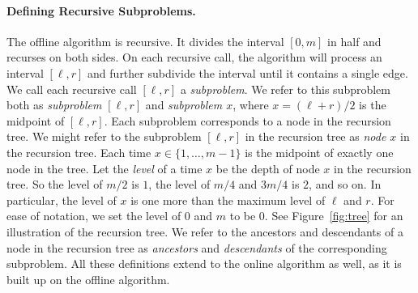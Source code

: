 \documentclass[11pt]{article}
\newcommand{\defn}{\emph}
\begin{document}
\paragraph{Defining Recursive Subproblems.}
The offline algorithm is recursive.
It divides the interval $[0,m]$ in half and recurses on both sides. On each recursive call, the algorithm will process an interval $[\ell, r]$ and further subdivide the interval until it contains a single edge. 
We call each recursive call $[\ell,r]$ a \emph{subproblem}.
We refer to this subproblem both as \emph{subproblem $[\ell,r]$} and \emph{subproblem $x$}, where $x=(\ell+r)/2$ is the midpoint of $[\ell,r]$.
Each subproblem corresponds to a node in the recursion tree.
We might refer to the subproblem $[\ell,r]$ in the recursion tree as \emph{node $x$} in the recursion tree.
Each time $x \in \{1,\ldots,m-1\}$ is the midpoint of exactly one node in the tree.
Let the \defn{level} of a time $x$ be the depth of node $x$ in the recursion tree. 
So the level of $m/2$ is $1$, the level of $m/4$ and $3m/4$ is $2$, and so on.
In particular, the level of $x$ is one more than the maximum level of $\ell$ and $r$.
For ease of notation, we set the level of 0 and $m$ to be 0. 
See Figure~\ref{fig:tree} for an illustration of the recursion tree.
We refer to the ancestors and descendants of a node in the recursion tree as \emph{ancestors} and \emph{descendants} of the corresponding subproblem.
All these definitions extend to the online algorithm as well, as it is built up on the offline algorithm.
\end{document}
